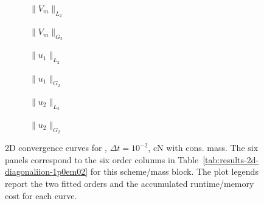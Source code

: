 \begin{figure}[p]
\centering
\begin{subfigure}{0.485\linewidth}
\centering
{}
\caption{$\|V_m\|_{L_2}$}
\label{fig:results-2d-diagonaliion-1p0em02-cranknicolson-consistent-a}
\end{subfigure}
\hfill
\begin{subfigure}{0.485\linewidth}
\centering
{}
\caption{$\|V_m\|_{G_2}$}
\label{fig:results-2d-diagonaliion-1p0em02-cranknicolson-consistent-b}
\end{subfigure}
\par\vspace{0.8em}
\begin{subfigure}{0.485\linewidth}
\centering
{}
\caption{$\|u_1\|_{L_2}$}
\label{fig:results-2d-diagonaliion-1p0em02-cranknicolson-consistent-c}
\end{subfigure}
\hfill
\begin{subfigure}{0.485\linewidth}
\centering
{}
\caption{$\|u_1\|_{G_2}$}
\label{fig:results-2d-diagonaliion-1p0em02-cranknicolson-consistent-d}
\end{subfigure}
\par\vspace{0.8em}
\begin{subfigure}{0.485\linewidth}
\centering
{}
\caption{$\|u_2\|_{L_2}$}
\label{fig:results-2d-diagonaliion-1p0em02-cranknicolson-consistent-e}
\end{subfigure}
\hfill
\begin{subfigure}{0.485\linewidth}
\centering
{}
\caption{$\|u_2\|_{G_2}$}
\label{fig:results-2d-diagonaliion-1p0em02-cranknicolson-consistent-f}
\end{subfigure}
\caption{2D convergence curves for , $\Delta t=10^{-2}$, cN with cons. mass. The six panels correspond to the six order columns in Table~\ref{tab:results-2d-diagonaliion-1p0em02} for this scheme/mass block. The plot legends report the two fitted orders and the accumulated runtime/memory cost for each curve.}
\label{fig:results-2d-diagonaliion-1p0em02-cranknicolson-consistent}
\end{figure}
\FloatBarrier

